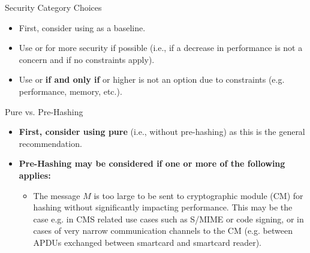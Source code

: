 \documentclass[11pt,english,a4paper, landscape]{scrartcl}
\begin{document}
	\begin{minipage}[t]{0.28\textwidth}
		\vspace{0pt}
		\begin{algorithmbox}{Security Category Choices}
			\scriptsize
			\begin{itemize}[leftmargin=*]
				\setlength\itemsep{0em}
				\item First, consider using \hspace{-3mm} as a baseline.\\
				\item Use \hspace{-3mm} or
				\hspace{-3mm} for more security if possible (i.e., if a decrease in performance is not a concern and if no constraints apply).\\
				\item Use \hspace{-3mm} or
				\hspace{-3mm} {\bfseries if and only if} \hspace{-3mm} or higher is not an option due to constraints (e.g. performance, memory, etc.).\\[\baselineskip]
			\end{itemize}
		\end{algorithmbox}
		\begin{algorithmbox}{Pure vs. Pre-Hashing}
			\scriptsize
			\begin{itemize}[leftmargin=*]
				\setlength\itemsep{0em}
				\item {\bfseries First, consider using  pure} (i.e., without pre-hashing) as this is the general recommendation.\\
				\item {\bfseries Pre-Hashing may be considered if one or more of the following applies:}
				\begin{itemize}[leftmargin=*]
					\setlength\itemsep{0em}
					\item The message $M$ is too large to be sent to cryptographic module (CM) for hashing without significantly impacting performance. This may be the case e.g. in CMS related use cases such as S/MIME or code signing, or in cases of very narrow communication channels to the CM (e.g. between APDUs exchanged between smartcard and smartcard reader).

\end{itemize}
\end{itemize}
\end{algorithmbox}
\end{minipage}
\end{document}
